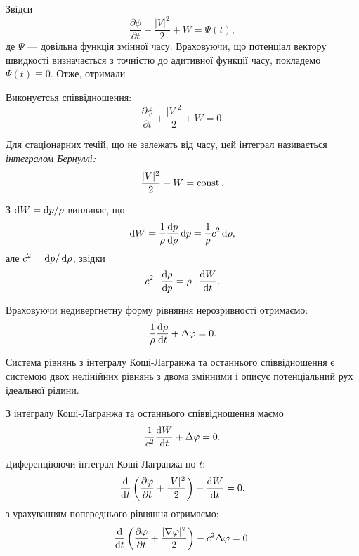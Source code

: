 Звідси  
\begin{equation}
	\frac{\partial \phi}{\partial t} + \frac{|V|^2}{2} + W = \Psi(t), 
\end{equation}
де $\Psi$ --- довільна функція змінної часу. Враховуючи, що потенціал вектору швидкості визначається з точністю до адитивної функції часу, покладемо $\Psi(t) \equiv 0$. Отже, отримали
\begin{th_equation}
	Виконуєтсья співвідношення:
	\begin{equation}
		\frac{\partial \phi}{\partial t} + \frac{|V|^2}{2} + W = 0.
	\end{equation}
\end{th_equation}

\begin{definition}
	Для стаціонарних течій, що не залежать від часу, цей інтеграл називається \it{інтегралом Бернуллі}:
	\begin{equation}
		\frac{|V|^2}{2} + W = \operatorname{const}.
	\end{equation}
\end{definition}

З $\mathop{}\!\mathrm{d} W = \mathop{}\!\mathrm{d} p / \rho$ випливає, що
\begin{equation}
	\mathop{}\!\mathrm{d} W = \frac{1}{\rho} \frac{\mathop{}\!\mathrm{d} p}{\mathop{}\!\mathrm{d} \rho} \mathop{}\!\mathrm{d} p = \frac{1}{\rho} c^2 \mathop{}\!\mathrm{d} \rho,
\end{equation}
але $c^2 = \mathop{}\!\mathrm{d} p / \mathop{}\!\mathrm{d} \rho$, звідки
\begin{equation}
	c^2 \cdot \frac{\mathop{}\!\mathrm{d} \rho}{\mathop{}\!\mathrm{d} p} = \rho \cdot \frac{\mathop{}\!\mathrm{d} W}{\mathop{}\!\mathrm{d} t}.
\end{equation}

Враховуючи недивергнетну форму рівняння нерозривності отримаємо:
\begin{equation}
	\frac{1}{\rho} \frac{\mathop{}\!\mathrm{d} \rho}{\mathop{}\!\mathrm{d} t} + \Delta \varphi = 0.
\end{equation}

Система рівнянь з інтегралу Коші-Лагранжа та останнього співвідношення є системою двох нелінійних рівнянь з двома змінними і описує потенціальний рух ідеальної рідини. \medskip

З інтегралу Коші-Лагранжа та останнього співвідношення маємо
\begin{equation}
	\frac{1}{c^2} \frac{\mathop{}\!\mathrm{d} W}{\mathop{}\!\mathrm{d} t} + \Delta \varphi = 0.
\end{equation}

Диференціюючи інтеграл Коші-Лагранжа по $t$:
\begin{equation}
	\frac{\mathop{}\!\mathrm{d}}{\mathop{}\!\mathrm{d} t} \left( \frac{\partial \varphi}{\partial t} + \frac{|V|^2}{2} \right) + \frac{\mathop{}\!\mathrm{d} W}{\mathop{}\!\mathrm{d} t} = 0.
\end{equation}
з урахуванням попереднього рівняння отримаємо:
\begin{equation}
	\frac{\mathop{}\!\mathrm{d}}{\mathop{}\!\mathrm{d} t} \left( \frac{\partial \varphi}{\partial t} + \frac{|\nabla \varphi|^2}{2} \right) - c^2 \Delta \varphi = 0.
\end{equation}

